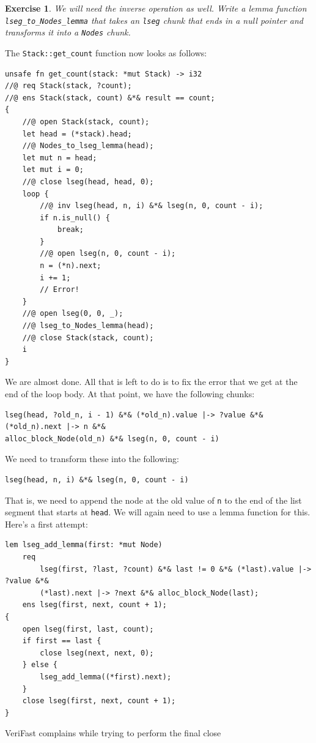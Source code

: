 \documentclass{article}
\newtheorem{exercise}{Exercise}
\begin{document}
\begin{exercise}\label{exercise:lemma}
We will need the inverse operation as well. Write a lemma
function \lstinline!lseg_to_Nodes_lemma! that takes an
\lstinline!lseg! chunk that ends in a null pointer and transforms it into a
\lstinline!Nodes! chunk.
\end{exercise}

The \lstinline!Stack::get_count! function now looks as follows:
\begin{lstlisting}
unsafe fn get_count(stack: *mut Stack) -> i32
//@ req Stack(stack, ?count);
//@ ens Stack(stack, count) &*& result == count;
{
    //@ open Stack(stack, count);
    let head = (*stack).head;
    //@ Nodes_to_lseg_lemma(head);
    let mut n = head;
    let mut i = 0;
    //@ close lseg(head, head, 0);
    loop {
        //@ inv lseg(head, n, i) &*& lseg(n, 0, count - i);
        if n.is_null() {
            break;
        }
        //@ open lseg(n, 0, count - i);
        n = (*n).next;
        i += 1;
        // Error!
    }
    //@ open lseg(0, 0, _);
    //@ lseg_to_Nodes_lemma(head);
    //@ close Stack(stack, count);
    i
}
\end{lstlisting}
We are almost done. All that is left to do is to fix the error
that we get at the end of the loop body. At that point, we have
the following chunks:
\begin{lstlisting}
lseg(head, ?old_n, i - 1) &*& (*old_n).value |-> ?value &*& (*old_n).next |-> n &*&
alloc_block_Node(old_n) &*& lseg(n, 0, count - i)
\end{lstlisting}
We need to transform these into the following:
\begin{lstlisting}
lseg(head, n, i) &*& lseg(n, 0, count - i)
\end{lstlisting}
That is, we need to append the node at the old value of
\lstinline!n! to the end of the list segment that starts at
\lstinline!head!. We will again need to use a lemma function
for this. Here's a first attempt:
\begin{lstlisting}
lem lseg_add_lemma(first: *mut Node)
    req
        lseg(first, ?last, ?count) &*& last != 0 &*& (*last).value |-> ?value &*&
        (*last).next |-> ?next &*& alloc_block_Node(last);
    ens lseg(first, next, count + 1);
{
    open lseg(first, last, count);
    if first == last {
        close lseg(next, next, 0);
    } else {
        lseg_add_lemma((*first).next);
    }
    close lseg(first, next, count + 1);
}
\end{lstlisting}
VeriFast complains while trying to perform the final close
\end{document}
